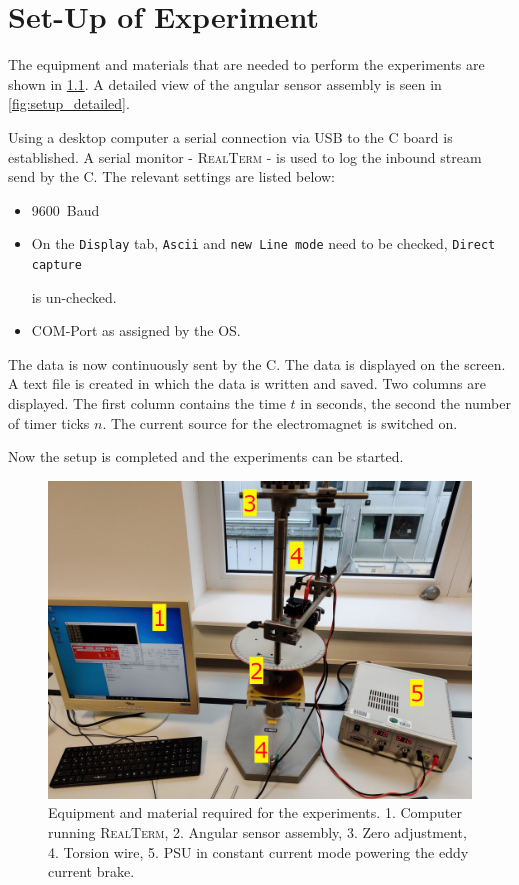 \chapter{Set-Up of Experiment}
%
	The equipment and materials that are needed to perform the experiments are shown in \cref{fig:setup_total}. A detailed
	view of the angular sensor assembly is seen in \cref{fig:setup_detailed}.\par
	Using a desktop computer a serial connection via USB to the \micro C board is established. A serial monitor - \textsc{RealTerm} - is used to
	log the inbound stream send by the \micro C. The relevant settings are listed below:\par
	\begin{itemize}
		\item \SI{9600}{Baud}
		\item On the \texttt{Display} tab, \texttt{Ascii} and \texttt{new Line mode} need to be checked, \texttt{Direct capture}\par
		is un-checked.
		\item COM-Port as assigned by the OS.
	\end{itemize}
	The data is now continuously sent by the \micro C. The data is displayed on the screen. A text file is created in
	which the data is written and saved. Two columns are displayed. The first column contains the time \(t\) in seconds, the
	second the number of timer ticks \(n\). The current source for the electromagnet is switched on.\par
	Now the setup is completed and the experiments can be started.
	\begin{figure}[h]
		\centering
		\includegraphics[width=.8\textwidth]{aufbau/setup_total_num.jpg}
		\caption[Equipment used.]{ Equipment and material required for the experiments. 1. Computer running \textsc{RealTerm}, 2. Angular sensor assembly,
		3. Zero adjustment, 4. Torsion wire, 5. PSU in constant current mode powering the eddy current brake.}
		\label{fig:setup_total}
	\end{figure}
